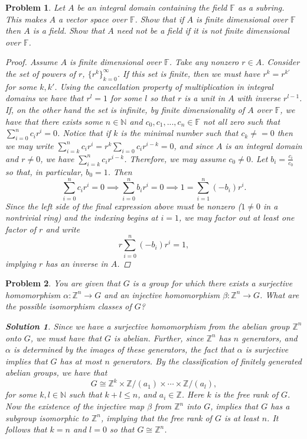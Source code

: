 \documentclass[11pt]{article}
\newcommand{\N}{\mathbb{N}}
\newcommand{\Z}{\mathbb{Z}}
\newcommand{\F}{\mathbb{F}}
\newcommand{\1}{\textbf{1}}
\newtheorem{prob}{Problem}
\newtheorem*{sol*}{\textit{Solution}}
\begin{document}
\begin{prob}
Let $A$ be an integral domain containing the field  $\F$ as a subring. This makes $A$ a vector space over $\F$. Show that if $A$ is finite dimensional over $\F$ then $A$ is a field. Show that $A$ need not be a field if it is not finite dimensional over $\F$.  

\begin{proof}
Assume $A$ is finite dimensional over $\F$. Take any nonzero $r\in A$. Consider the set of powers of $r$, $\{r^k\}_{k=0}^\infty$. If this set is finite, then we must have $r^k = r^{k'}$ for some $k,k'$. Using the cancellation property of multiplication in integral domains we have that $r^l = 1$ for some $l$ so that $r$ is a unit in $A$ with inverse $r^{l-1}$. If, on the other hand the set is infinite, by finite dimensionality of $A$ over $\F$, we have that there exists some $n\in\N$ and $c_0,c_1,...,c_n\in\F$ not all zero such that $\sum_{i = 0}^n c_ir^i = 0$. Notice that if $k$ is the minimal number such that $c_k\neq = 0$ then we may write $\sum_{i = k}^n c_i r^i = r^k\sum_{i = 0}c_i r^{i-k} = 0$, and since $A$ is an integral domain and $r\neq 0$, we have $\sum_{i = k}^n c_i r^{i-k}$. Therefore, we may assume $c_0\neq 0$. Let $b_i = \frac{c_i}{c_0}$ so that, in particular, $b_0 = 1$. Then \[\sum_{i = 0}^n c_i r^i = 0 \implies \sum_{i = 0}^n b_i r^i = 0 \implies 1 = \sum_{i = 1}^n (-b_i) r^i.\] Since the left side of the final expression above must be nonzero ($1\neq 0$ in a nontrivial ring) and the indexing begins at $i = 1$, we may factor out at least one factor of $r$ and write \[r\sum_{i = 0}^n(-b_i)r^i = 1,\] implying $r$ has an inverse in $A$. 
\end{proof}
\end{prob}

\begin{prob}
You are given that $G$ is a group for which there exists a surjective homomorphism $\alpha:\Z^n\rightarrow G$ and an injective homomorphism $\beta :\Z^n\rightarrow G$. What are the possible isomorphism classes of $G$? 

\begin{sol*}
\textnormal{Since we have a surjective homomorphism from the abelian group  $\Z^n$ onto $G$, we must have that $G$ is abelian. Further, since $\Z^n$ has $n$ generators, and $\alpha$ is determined by the images of these generators, the fact that $\alpha$ is surjective implies that $G$ has at most $n$ generators. By the classification of finitely generated abelian groups, we have that \[G\cong \Z^k\times\Z/(a_1)\times\cdots\times\Z/(a_l),\] for some $k,l\in\N$ such that $k + l \leq n$, and $a_i\in\Z$. Here $k$ is the free rank of $G$. Now the existence of the injective map $\beta$ from $\Z^n$ into $G$, implies that $G$ has a subgroup isomorphic to $\Z^n$, implying that the free rank of $G$ is at least $n$. It follows that $k = n$ and $l = 0$ so that $G\cong\Z^n$. 
}
\end{sol*}
\end{prob}
\end{document}
